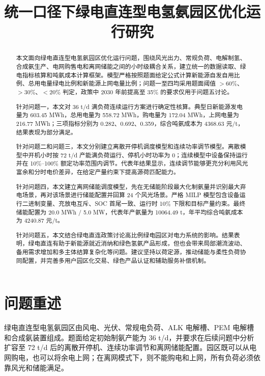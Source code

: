 \documentclass[bwprint]{gmcmthesis}
\title{统一口径下绿电直连型电氢氨园区优化运行研究}
\numberwithin{figure}{section}
\numberwithin{table}{section}
\begin{document}
\maketitle

\begin{abstract}
本文面向绿电直连型电氢氨园区优化运行问题，围绕风光出力、常规负荷、电解制氢、合成氨生产、电网购售电和离网储能之间的小时级耦合关系，建立统一的数据读取、绿电指标核算和吨氨成本计算框架。模型严格按照题面给定公式计算新能源自发自用比例、总用电量绿电比例和新能源上网电量比例；问题一至四均采用题面阈值 $>60\%$、$>30\%$、$<20\%$ 判定，政策中 2030 年前提高至 35\% 的要求仅用于问题五讨论。

针对问题一，本文对 36 t/d 满负荷连续运行方案进行确定性核算。典型日新能源发电量为 603.45 MWh，总用电量为 558.72 MWh，购电量为 172.04 MWh，上网电量为 216.77 MWh；三项指标分别为 0.282、0.692、0.359，综合吨氨成本为 4368.63 元/t，结果表现为部分满足。

针对问题二和问题三，本文分别建立离散开停机调度模型和连续功率调节模型。离散模型中开机小时按 72 t/d 产能满负荷运行、停机小时功率为 0；连续模型中设备保持运行并在 10\%--100\% 额定功率范围内调节。代表年结果显示，连续调节能够更充分利用风光富余和分时电价差异，在给定产量约束下提高源荷匹配能力。

针对问题四，本文建立离网储能调度模型，先在无储能阶段最大化制氨量并识别最大弃电场景，再对该场景进行储能配置并回算 24 个风光场景。严格 MILP 模型包含设备运行二进制变量、充放电互斥、SOC 首尾一致、运行时 10\% 下限和目标产量约束。最终储能配置为 20.0 MWh / 5.0 MW，代表年产氨量为 10064.49 t，年平均综合吨氨成本为 4240.87 元/t。

针对问题五，本文结合绿电直连政策讨论高比例绿电园区对电力系统的影响。结果表明，绿电直连有助于新能源就近消纳和绿色氢氨产品形成，但也会带来局部潮流波动、备用需求增加和多主体结算复杂化等问题。建议坚持以荷定源，推动储能与柔性负荷协同配置，并完善多用户园区化交易、绿色产品认证和辅助服务补偿机制。

\end{abstract}

\tableofcontents

\section{问题重述}
绿电直连型电氢氨园区由风电、光伏、常规电负荷、ALK 电解槽、PEM 电解槽和合成氨装置组成。题面给定初始制氨产能为 36 t/d，并要求在后续问题中分析扩容至 72 t/d 后的离散开停机、连续功率调节和离网储能配置。园区既可以从电网购电，也可以将余电上网；在离网模式下，则不能购电和上网，所有负荷必须依靠风光和储能满足。
\end{document}
